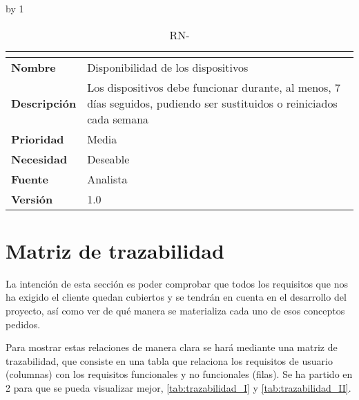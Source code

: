 \advance\rn by 1
\begin{table}[H]
	\caption{RN-\number\rn}
	\begin{tabular}{|l|p{}|}
		\hline
		\multicolumn{2}{|c|}{\cellcolor[HTML]{BFBFBF}{\color[HTML]{000000} \textbf{RN-\number\rn}}} \\ \hline
		\textbf{Nombre}      & Disponibilidad de los dispositivos                                                                                     \\ \hline
		\textbf{Descripción} & Los dispositivos debe funcionar durante, al menos, 7 días seguidos, pudiendo ser sustituidos o reiniciados cada semana \\ \hline
		\textbf{Prioridad}   & Media                                                                                                                  \\ \hline
		\textbf{Necesidad}   & Deseable                                                                                                               \\ \hline
		\textbf{Fuente}      & Analista                                                                                                               \\ \hline
		\textbf{Versión}     & 1.0                                                                                                                    \\ \hline
	\end{tabular}
\end{table}
\pagebreak

\section{Matriz de trazabilidad}\label{sec:matrizAnalisis}
La intención de esta sección es poder comprobar que todos los requisitos que nos ha exigido el cliente quedan cubiertos y se tendrán en cuenta en el desarrollo del proyecto, así como ver de qué manera se materializa cada uno de esos conceptos pedidos. 

Para mostrar estas relaciones de manera clara se hará mediante una matriz de trazabilidad, que consiste en una tabla que relaciona los requisitos de usuario (columnas) con los requisitos funcionales y no funcionales (filas). Se ha partido en 2 para que se pueda visualizar mejor, \autoref{tab:trazabilidad_I} y \autoref{tab:trazabilidad_II}.

